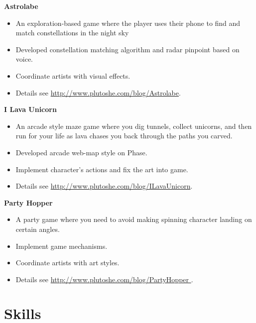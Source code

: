 \documentclass{article}
\begin{document}
{		
		\textbf{Astrolabe} \hfill \quad
		
		\begin{itemize}
			\item An exploration-based game where the player uses their phone to find and match constellations in the night sky
			\item Developed constellation matching algorithm and radar pinpoint based on voice.
			\item Coordinate artists with visual effects.
			\item Details see \url{http://www.plutoshe.com/blog/Astrolabe}.
		\end{itemize}
		
		
		
		\textbf{I Lava Unicorn} \hfill \quad
		
		\begin{itemize}
			\item An arcade style maze game where you dig tunnels, collect unicorns, and then run for your life as lava chases you back through the paths you carved.
			\item Developed arcade web-map style on Phase.
			\item Implement character's actions and fix the art into game.
			\item Details see \url{http://www.plutoshe.com/blog/ILavaUnicorn}.
		\end{itemize}
		\textbf{Party Hopper} \hfill \quad
				
		\begin{itemize}
			\item A party game where you need to avoid making spinning character landing on certain angles.
			\item Implement game mechanisms.
			\item Coordinate artists with art styles.
			\item Details see \url{http://www.plutoshe.com/blog/PartyHopper }.
		\end{itemize}
		
		
		\vspace{10pt}
		\section{Skills}
				\hspace{0.3in}
				
				\hspace{0.3in}
		
}
\end{document}
